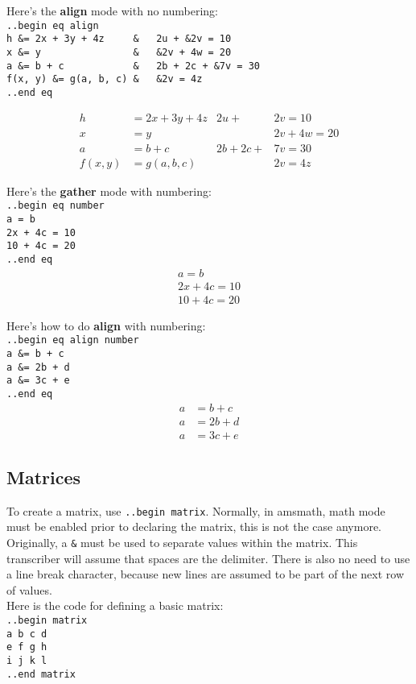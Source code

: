 \documentclass[12pt]{article}
\newcommand{\nl}{\\}
\renewcommand\bold{\textbf}
\begin{document}
\begin{flushleft}
\medskip

Here's the \bold{align} mode with no numbering: \nl
\verb|..begin eq align|\nl
\verb|h &= 2x + 3y + 4z     &   2u + &2v = 10|\nl
\verb|x &= y                &   &2v + 4w = 20|\nl
\verb|a &= b + c            &   2b + 2c + &7v = 30|\nl
\verb|f(x, y) &= g(a, b, c) &   &2v = 4z|\nl
\verb|..end eq|

\begin{align*}
h &= 2x + 3y + 4z			&	2u + &2v = 10 \\
x &= y						&	&2v + 4w = 20 \\
a &= b + c					&	2b + 2c + &7v = 30 \\
f(x, y) &= g(a, b, c)		&	&2v = 4z 
\end{align*}

\medskip

Here's the \bold{gather} mode with numbering: \nl
\verb|..begin eq number|\nl
\verb|a = b|\nl
\verb|2x + 4c = 10|\nl
\verb|10 + 4c = 20|\nl
\verb|..end eq|
\begin{gather}
a = b \\
2x + 4c = 10 \\
10 + 4c = 20 
\end{gather}

\medskip

Here's how to do \bold{align} with numbering: \nl
\verb|..begin eq align number|\nl
\verb|a &= b + c|\nl
\verb|a &= 2b + d|\nl
\verb|a &= 3c + e|\nl
\verb|..end eq|
\begin{align}
a &= b + c \\
a &= 2b + d \\
a &= 3c + e 
\end{align}

\newpage

\subsection*{Matrices}

To create a matrix, use \verb|..begin matrix|. Normally, in amsmath, math mode must be enabled prior to declaring the matrix, this is not the case anymore. \nl
Originally, a \verb|&| must be used to separate values within the matrix. This transcriber will assume that spaces are the delimiter. There is also no need to use a line break character, because new lines are assumed to be part of the next row of values. \nl
Here is the code for defining a basic matrix: \nl
\verb|..begin matrix|\nl
\verb|a b c d|\nl
\verb|e f g h|\nl
\verb|i j k l|\nl
\verb|..end matrix|


\end{flushleft}
\end{document}
